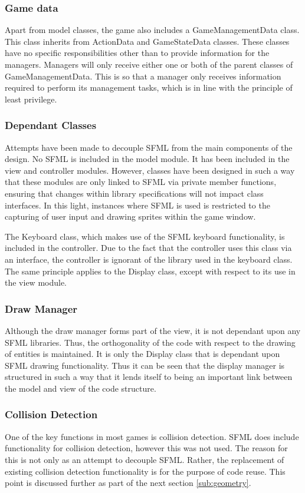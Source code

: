 \documentclass[10pt,twocolumn]{witseiepaper}
\begin{document}
\subsubsection{Game data} Apart from model classes, the game also includes a GameManagementData class. This class inherits from ActionData and GameStateData classes. These classes have no specific responsibilities other than to provide information for the managers. Managers will only receive either one or both of the parent classes of GameManagementData. This is so that a manager only receives information required to perform its management tasks, which is in line with the principle of least privilege.

\subsubsection{Dependant Classes}  Attempts have been made to decouple SFML from the main components of the design. No SFML is included in the model module. It has been included in the view and controller modules. However, classes have been designed in such a way that these modules are only linked to SFML via private member functions, ensuring that changes within library specifications will not impact class interfaces. In this light, instances where SFML is used is restricted to the capturing  of user input and drawing sprites within the game window.

The Keyboard class, which makes use of the SFML keyboard functionality, is included in the controller. Due to the fact that the controller uses this class via an interface, the controller is ignorant of the library used in the keyboard class. The same principle applies to the Display class, except with respect to its use in the view module. 

\subsubsection{Draw Manager} Although the draw manager forms part of the view, it is not dependant upon any SFML libraries. Thus, the orthogonality of the code with respect to the drawing of entities is maintained. It is only the Display class that is dependant upon SFML drawing functionality. Thus it can be seen that the display manager is structured in such a way that it lends itself to being an important link between the model and view of the code structure.

\subsubsection{Collision Detection} One of the key functions in most games is collision detection. SFML does include functionality for collision detection, however this was not used. The reason for this is not only as an attempt to decouple SFML. Rather, the replacement of existing collision detection functionality is for the purpose of code reuse. This point is discussed further as part of the next section \ref{sub:geometry}.
\end{document}
